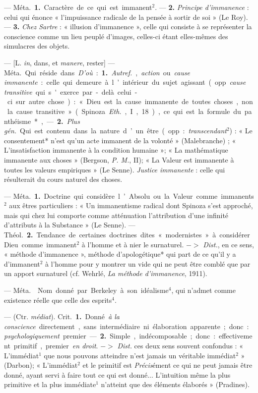 \begin{itemize}[leftmargin=1cm, label=, itemsep=1pt]
 — \si{Méta.} {\bf 1.} Caractère de ce qui est immanent$^2$.
— {\bf 2.} {\it Principe d'immanence} : celui qui énonce « l'impuissance
radicale de la pensée à sortir de soi » (Le Roy). — {\bf 3.} {\it Chez
Sartre} : « illusion d’immanence », celle qui consiste à se représenter la
conscience comme un lieu peuplé d'images, celles-ci étant elles-mêmes des
simulacres des objets.

 — [L. {\it in}, dans, et {\it manere}, rester] — \si{Méta.} Qui
réside dans. {\it D'où} : {\bf 1.} {\it Autref.}, {\it action} ou {\it cause
immanente} : celle qui demeure à l’intérieur du sujet agissant (opp.
{\it cause transitive} qui s'exerce par-delà celui-ci sur autre chose) :
« Dieu
est la cause immanente de toutes choses, non la cause transitive » (Spinoza
{\it Eth.}, I, 18), ce qui est la formule du panthéisme*, — {\bf 2.}
{\it Plus gén.} Qui est contenu dans la nature d’un être (opp. :
{\it transcendant}$^2$) : « Le consentement* n'est qu’un acte immanent de la
volonté » (Malebranche) ; « L’insatisfaction immanente à la condition
humaine »; « La mathématique immanente aux choses » (Bergson, {\it P. M.},
II); « La Valeur est immanente à toutes les valeurs empiriques » (Le Senne).
{\it Justice immanente} : celle qui résulterait du cours naturel des choses.

 —  \si{Méta.} {\bf 1.} Doctrine qui considère l’Absolu ou
la Valeur comme immanents$^2$ aux êtres particuliers : « Un immanentisme
radical dont Spinoza s’est approché, mais qui chez lui comporte comme
atténuation l'attribution d’une infinité d’attributs à la Substance » (Le
Senne). — \si{Théol.} {\bf 2.} Tendance de certaines doctrines dites
« modernistes » à considérer Dieu comme immanent$^2$ à l’homme et à nier le
surnaturel. $->$ {\it Dist.}, en ce sens, « méthode d’immanence », méthode
d’apologétique* qui part de ce qu'il y a d’immanent$^2$ à l’homme pour y montrer
un vide qui ne peut être comblé que par un apport surnaturel (cf. Wehrlé,
{\it La méthode d’immanence}, 1911).

 — \si{Méta.}  Nom donné par Berkeley à son
idéalisme$^4$, qui n'admet comme existence réelle que celle des esprits$^4$.

 — (Ctr. {\it médiat}). \si{Crit.} {\bf 1.} Donné {\it à la
conscience} directement, sans intermédiaire ni élaboration apparente ; donc :
{\it psychologiquement} premier. — {\bf 2.} Simple, indécomposable ; donc :
effectivement
primitif, premier {\it en droit}. $->$ {\it Dist.} ces deux sens souvent
confondus : « L’immédiat$^1$ que nous pouvons atteindre n’est jamais un
véritable immédiat$^2$ » (Darbon); « L'immédiat$^2$ et le primitif est
{\it Précis}ément ce qui ne peut jamais être donné, ayant servi à faire tout
ce qui est donné... L'intuition même la plus primitive et la plus
immédiate$^1$ n'atteint que des éléments élaborés » (Pradines).


\end{itemize}
